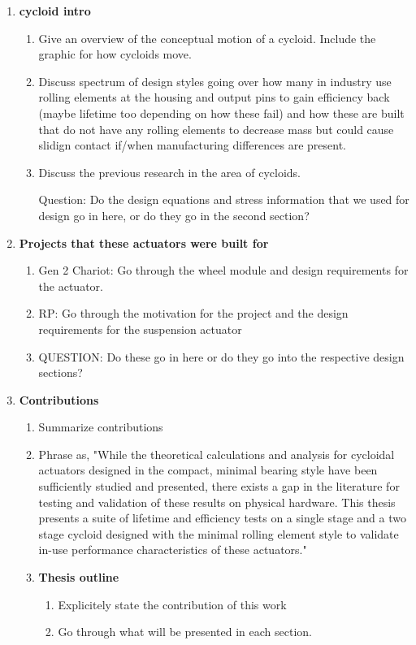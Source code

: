 \begin{enumerate}
\begin{enumerate}
		\item \textbf{cycloid intro}
		\begin{enumerate}
			\item
			Give an overview of the conceptual motion of a cycloid. Include the graphic for how cycloids move. 
			\item
			Discuss spectrum of design styles going over how many in industry use rolling elements at the housing and output pins to gain efficiency back (maybe lifetime too depending on how these fail) and how these are built that do not have any rolling elements to decrease mass but could cause slidign contact if/when manufacturing differences are present. 
			\item
			Discuss the previous research in the area of cycloids. 

			Question: Do the design equations and stress information that we used for design go in here, or do they go in the second section? 
		\end{enumerate}

		\item \textbf{Projects that these actuators were built for}
		\begin{enumerate}
			\item 
			Gen 2 Chariot: Go through the wheel module and design requirements for the actuator. 
			\item
			RP: Go through the motivation for the project and the design requirements for the suspension actuator 
			\item
			QUESTION: Do these go in here or do they go into the respective design sections? 
		\end{enumerate}

		\item \textbf{Contributions}
		\begin{enumerate}
			\item
			Summarize contributions 
			\item
			Phrase as, "While the theoretical calculations and analysis for cycloidal actuators designed in the compact, minimal bearing style have been sufficiently studied and presented, there exists a gap in the literature for testing and validation of these results on physical hardware. This thesis presents a suite of lifetime and efficiency tests on a single stage and a two stage cycloid designed with the minimal rolling element style to validate in-use performance characteristics of these actuators."

		\item \textbf{Thesis outline}
		\begin{enumerate}
			\item
			Explicitely state the contribution of this work
			\item
			Go through what will be presented in each section. 
		\end{enumerate}


\end{enumerate}
\end{enumerate}
\end{enumerate}
